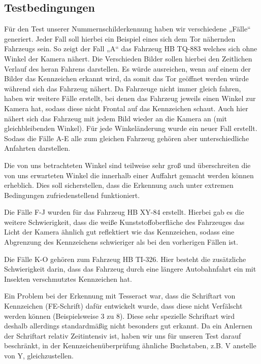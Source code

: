 \documentclass{../Vorlage/sebDenCls}
\begin{document}
\subsection{Testbedingungen}
Für den Test unserer Nummernschilderkennung haben wir verschiedene „Fälle“ generiert. Jeder Fall soll hierbei ein Beispiel eines sich dem Tor nähernden Fahrzeugs sein. So zeigt der Fall „A“ das Fahrzeug HB TQ-883 welches sich ohne Winkel der Kamera nähert. Die Verschieden Bilder sollen hierbei den Zeitlichen Verlauf des heran Fahrens darstellen. Es würde ausreichen, wenn auf einem der Bilder das Kennzeichen erkannt wird, da somit das Tor geöffnet werden würde während sich das Fahrzeug nähert. Da Fahrzeuge nicht immer gleich fahren, haben wir weitere Fälle erstellt, bei denen das Fahrzeug jeweils einen Winkel zur Kamera hat, sodass diese nicht Frontal auf das Kennzeichen schaut. Auch hier nähert sich das Fahrzeug mit jedem Bild wieder an die Kamera an (mit gleichbleibenden Winkel). Für jede Winkeländerung wurde ein neuer Fall erstellt.
Sodass die Fälle A-E alle zum gleichen Fahrzeug gehören aber unterschiedliche Anfahrten darstellen.

Die von uns betrachteten Winkel sind teilweise sehr groß und überschreiten die von uns erwarteten Winkel die innerhalb einer Auffahrt gemacht werden können erheblich. Dies soll sicherstellen, dass die Erkennung auch unter extremen Bedingungen zufriedenstellend funktioniert.

Die Fälle F-J wurden für das Fahrzeug HB XY-84 erstellt. Hierbei gab es die weitere Schwierigkeit, dass die weiße Kunststoffoberfläche des Fahrzeuges das Licht der Kamera ähnlich gut reflektiert wie das Kennzeichen, sodass eine Abgrenzung des Kennzeichens schwieriger als bei den vorherigen Fällen ist.

Die Fälle K-O gehören zum Fahrzeug HB TI-326. Hier besteht die zusätzliche Schwierigkeit darin, dass das Fahrzeug durch eine längere Autobahnfahrt ein mit Insekten verschmutztes Kennzeichen hat.

Ein Problem bei der Erkennung mit Tesseract war, dass die Schriftart von Kennzeichen (FE-Schrift)  dafür entwickelt wurde, dass diese nicht Verfälscht werden können (Beispielsweise 3 zu 8). Diese sehr spezielle Schriftart wird deshalb allerdings standardmäßig nicht besonders gut erkannt. Da ein Anlernen der Schriftart relativ Zeitintensiv ist, haben wir uns für unseren Test darauf beschränkt, in der Kennzeichenüberprüfung ähnliche Buchstaben, z.B. V anstelle von Y, gleichzustellen.
\end{document}
